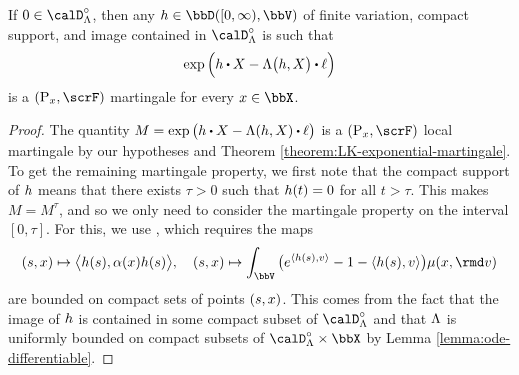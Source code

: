 \begin{theorem}
  \label{theorem:exponential-martingale}
  If $0 \in \odeSpace^\circ$, then any $\twistFunc \in \pathSpace{[0,\infty)}{\vecSpace}$ of finite variation, compact support, and image contained in $\odeSpace^\circ$ is such that
  \begin{equation*}
    \exp\Big( \twistFunc \shortInt \X - \ode\big(\twistFunc, \X\big) \shortInt \leb \Big)
  \end{equation*}
  is a $(\Prb_\stateVar, \scrF)$ martingale for every $\stateVar \in \stateSpace$.
\end{theorem}
\begin{proof}
  The quantity $M = \exp\big(\twistFunc \shortInt \X - \ode(\twistFunc, \X) \shortInt \leb \big)$ is a $(\Prb_\stateVar, \scrF)$ local martingale by our hypotheses and Theorem \ref{theorem:LK-exponential-martingale}.
  To get the remaining martingale property, we first note that the compact support of $h$ means that there exists $\tau > 0$ such that $h(t) = 0$ for all $t > \tau$.
  This makes $M = M^\tau$, and so we only need to consider the martingale property on the interval $[0,\tau]$.
  For this, we use \cite[Theorem 2.6]{spreij2010}, which requires the maps
  \begin{equation*}
    (s, \stateVar) \mapsto \bprj{\twistFunc(s)}{\affDiff(\stateVar)\twistFunc(s)}, \quad 
    (s, \stateVar) \mapsto \int_\vecSpace \big( e^\prj{\twistFunc(s)}{\markVar} - 1 - \prj{\twistFunc(s)}{\markVar} \big) \affJump(\stateVar, \rmd\markVar)
  \end{equation*}
  are bounded on compact sets of points $(s, x)$.
  This comes from the fact that the image of $h$ is contained in some compact subset of $\odeSpace^\circ$ and that $\Lambda$ is uniformly bounded on compact subsets of $\odeSpace^\circ \times \stateSpace$ by Lemma \ref{lemma:ode-differentiable}.
\end{proof}
